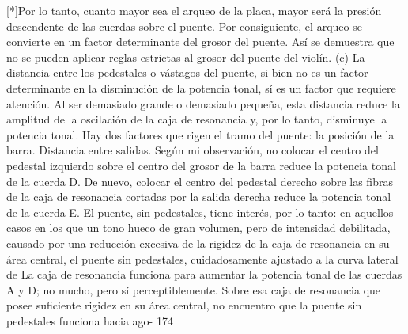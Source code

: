 [*]Por lo tanto, cuanto mayor sea el arqueo de la placa, mayor será la presión descendente de las cuerdas sobre el puente. Por consiguiente, el arqueo se convierte en un factor determinante del grosor del puente. Así se demuestra que no se pueden aplicar reglas estrictas al grosor del puente del violín. (c) La distancia entre los pedestales o vástagos del puente, si bien no es un factor determinante en la disminución de la potencia tonal, sí es un factor que requiere atención. Al ser demasiado grande o demasiado pequeña, esta distancia reduce la amplitud de la oscilación de la caja de resonancia y, por lo tanto, disminuye la potencia tonal.
Hay dos factores que rigen el tramo del puente: la posición de la barra.
Distancia entre salidas.
Según mi observación, no colocar el centro del pedestal izquierdo sobre el centro del grosor de la barra reduce la potencia tonal de la cuerda D. De nuevo, colocar el centro del pedestal derecho sobre las fibras de la caja de resonancia cortadas por la salida derecha reduce la potencia tonal de la cuerda E. El puente, sin pedestales, tiene interés, por lo tanto: en aquellos casos en los que un tono hueco de gran volumen, pero de intensidad debilitada, causado por una reducción excesiva de la rigidez de la caja de resonancia en su área central, el puente sin pedestales, cuidadosamente ajustado a la curva lateral de
La caja de resonancia funciona para aumentar la potencia tonal de las cuerdas A y D; no mucho, pero sí perceptiblemente. Sobre esa caja de resonancia que posee suficiente
rigidez en su área central, no encuentro que la
puente sin pedestales funciona hacia ago- 174

